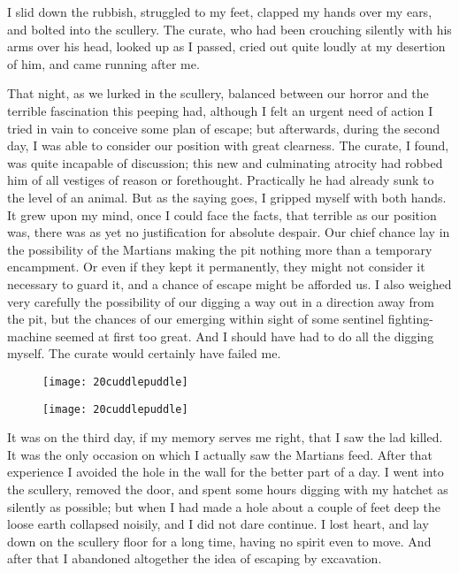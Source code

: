I slid down the rubbish, struggled to my feet, clapped my hands over my ears, and bolted into the scullery. The curate, who had been crouching silently with his arms over his head, looked up as I passed, cried out quite loudly at my desertion of him, and came running after me.

That night, as we lurked in the scullery, balanced between our horror and the terrible fascination this peeping had, although I felt an urgent need of action I tried in vain to conceive some plan of escape; but afterwards, during the second day, I was able to consider our position with great clearness. The curate, I found, was quite incapable of discussion; this new and culminating atrocity had robbed him of all vestiges of reason or forethought. Practically he had already sunk to the level of an animal. But as the saying goes, I gripped myself with both hands. It grew upon my mind, once I could face the facts, that terrible as our position was, there was as yet no justification for absolute despair. Our chief chance lay in the possibility of the Martians making the pit nothing more than a temporary encampment. Or even if they kept it permanently, they might not consider it necessary to guard it, and a chance of escape might be afforded us. I also weighed very carefully the possibility of our digging a way out in a direction away from the pit, but the chances of our emerging within sight of some sentinel fighting-machine seemed at first too great. And I should have had to do all the digging myself. The curate would certainly have failed me.

\begin{letter}
	\begin{figure}[tb]
	\centering
	\texttt{[image: 20cuddlepuddle]}
	\end{figure}
\end{letter}

\begin{a4}
	\begin{figure}[tb]
	\centering
	\texttt{[image: 20cuddlepuddle]}
	\end{figure}
\end{a4}

It was on the third day, if my memory serves me right, that I saw the lad killed. It was the only occasion on which I actually saw the Martians feed. After that experience I avoided the hole in the wall for the better part of a day. I went into the scullery, removed the door, and spent some hours digging with my hatchet as silently as possible; but when I had made a hole about a couple of feet deep the loose earth collapsed noisily, and I did not dare continue. I lost heart, and lay down on the scullery floor for a long time, having no spirit even to move. And after that I abandoned altogether the idea of escaping by excavation.


